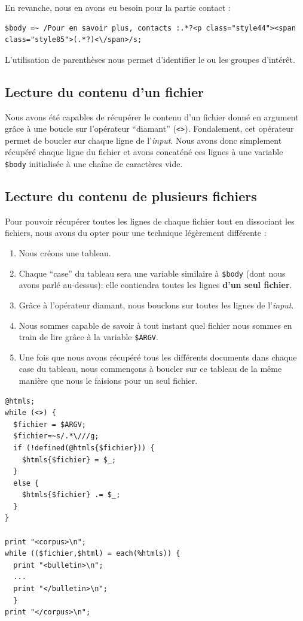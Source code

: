 En revanche, nous en avons eu besoin pour la partie contact :

\begin{lstlisting}
$body =~ /Pour en savoir plus, contacts :.*?<p class="style44"><span class="style85">(.*?)<\/span>/s;
\end{lstlisting}
L'utilisation de parenthèses nous permet d'identifier le ou les groupes d'intérêt.

\subsection{Lecture du contenu d'un fichier}

Nous avons été capables de récupérer le contenu d'un fichier donné en argument grâce à une boucle sur l'opérateur ``diamant'' (\lstinline{<>}). Fondalement, cet opérateur permet de boucler sur chaque ligne de l'\textit{input}. Nous avons donc simplement récupéré chaque ligne du fichier et avons concaténé ces lignes à une variable \lstinline{$body} initialisée à une chaîne de caractères vide.

\subsection{Lecture du contenu de plusieurs fichiers}

Pour pouvoir récupérer toutes les lignes de chaque fichier tout en dissociant les fichiers, nous avons du opter pour une technique légèrement différente :

\begin{enumerate}
  \item Nous créons une tableau.
  \item Chaque ``case'' du tableau sera une variable similaire à \lstinline{$body} (dont nous avons parlé au-dessus): elle contiendra toutes les lignes \textbf{d'un seul fichier}.
  \item Grâce à l'opérateur diamant, nous bouclons sur toutes les lignes de l'\textit{input}.
  \item Nous sommes capable de savoir à tout instant quel fichier nous sommes en train de lire grâce à la variable \lstinline{$ARGV}.
  \item Une fois que nous avons récupéré tous les différents documents dans chaque case du tableau, nous commençons à boucler sur ce tableau de la même manière que nous le faisions pour un seul fichier.
\end{enumerate}

\perl
\begin{lstlisting}
@htmls;
while (<>) {
  $fichier = $ARGV;
  $fichier=~s/.*\///g;
  if (!defined(@htmls{$fichier})) {
    $htmls{$fichier} = $_;
  }
  else {
    $htmls{$fichier} .= $_;
  }
}

print "<corpus>\n";
while (($fichier,$html) = each(%htmls)) {
  print "<bulletin>\n";
  ...
  print "</bulletin>\n";
  }
print "</corpus>\n";
\end{lstlisting}

